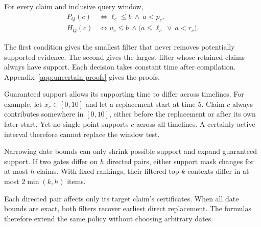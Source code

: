 \begin{theorem}
\label{thm:window-support}
For every claim and inclusive query window,
\begin{align}
 P_Q(c) &\iff \ell_c\leq b\ \land\ a<p_c,
 \label{eq:possible-window}\\
 H_Q(c) &\iff u_c\leq b\ \land\bigl(a\leq\ell_c\ \lor\ a<r_c\bigr).
 \label{eq:guaranteed-window}
\end{align}
\end{theorem}
The first condition gives the smallest filter that never removes potentially supported evidence.
The second gives the largest filter whose retained claims always have support.
Each decision takes constant time after compilation.
Appendix~\ref{app:uncertain-proofs} gives the proofs.

Guaranteed support allows its supporting time to differ across timelines.
For example, let $x_c\in[0,10]$ and let a replacement start at time 5.
Claim $c$ always contributes somewhere in $[0,10]$, either before the replacement or after its own later start.
Yet no single point supports $c$ across all timelines.
A certainly active interval therefore cannot replace the window test.

\begin{corollary}
\label{cor:uncertain-refinement}
Narrowing date bounds can only shrink possible support and expand guaranteed support.
If two gates differ on $h$ directed pairs, either support mask changes for at most $h$ claims.
With fixed rankings, their filtered top-$k$ contexts differ in at most $2\min(k,h)$ items.
\end{corollary}
Each directed pair affects only its target claim's certificates.
When all date bounds are exact, both filters recover earliest direct replacement.
The formulas therefore extend the same policy without choosing arbitrary dates.
